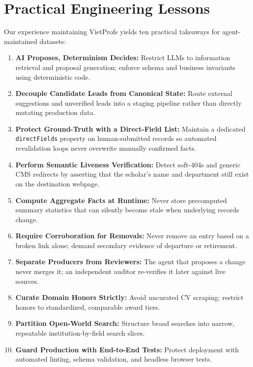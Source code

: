 \documentclass[11pt]{article}
\newcommand{\code}[1]{\texttt{\small #1}}
\begin{document}
\section{Practical Engineering Lessons}
Our experience maintaining VietProfs yields ten practical takeaways for agent-maintained datasets:
\begin{enumerate}
\item \textbf{AI Proposes, Determinism Decides:} Restrict LLMs to information retrieval and proposal generation; enforce schema and business invariants using deterministic code.
\item \textbf{Decouple Candidate Leads from Canonical State:} Route external suggestions and unverified leads into a staging pipeline rather than directly mutating production data.
\item \textbf{Protect Ground-Truth with a Direct-Field List:} Maintain a dedicated \code{directFields} property on human-submitted records so automated revalidation loops never overwrite manually confirmed facts.
\item \textbf{Perform Semantic Liveness Verification:} Detect soft-404s and generic CMS redirects by asserting that the scholar's name and department still exist on the destination webpage.
\item \textbf{Compute Aggregate Facts at Runtime:} Never store precomputed summary statistics that can silently become stale when underlying records change.
\item \textbf{Require Corroboration for Removals:} Never remove an entry based on a broken link alone; demand secondary evidence of departure or retirement.
\item \textbf{Separate Producers from Reviewers:} The agent that proposes a change never merges it; an independent auditor re-verifies it later against live sources.
\item \textbf{Curate Domain Honors Strictly:} Avoid uncurated CV scraping; restrict honors to standardized, comparable award tiers.
\item \textbf{Partition Open-World Search:} Structure broad searches into narrow, repeatable institution-by-field search slices.
\item \textbf{Guard Production with End-to-End Tests:} Protect deployment with automated linting, schema validation, and headless browser tests.
\end{enumerate}
\end{document}
